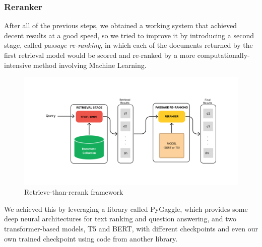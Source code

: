 \subsubsection{Reranker}
\label{subsubsec:reranker}

After all of the previous steps, we obtained a working system that achieved decent results at a good speed, so we tried to improve it by introducing a second stage, called \textit{passage re-ranking}, in which each of the documents returned by the first retrieval model would be scored and re-ranked by a more computationally-intensive method involving Machine Learning. \\
\begin{figure}[!h]
  \centering
  \includegraphics[width=0.8\linewidth]{figure/rerank_framework.png}
  \caption{Retrieve-than-rerank framework}
  \label{fig:rerank}
\end{figure}
We achieved this by leveraging a library called PyGaggle\cite{pygaggle}, which provides some deep neural architectures for text ranking and question answering, and two transformer-based models, T5 and BERT, with different checkpoints and even our own trained checkpoint using code from another library\cite{gao2021lce}. \\

